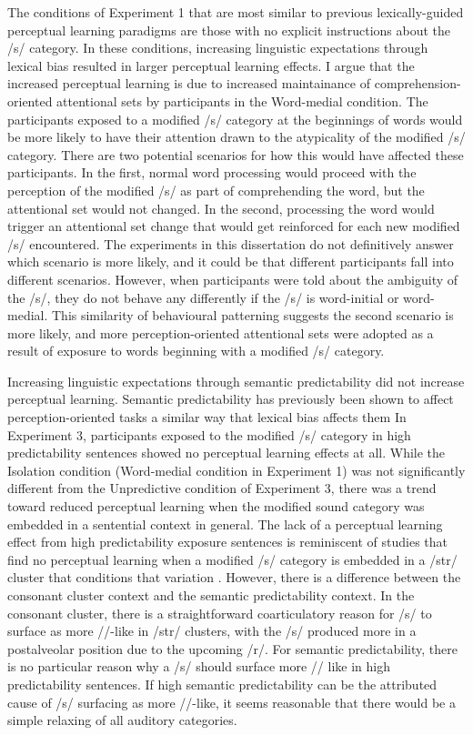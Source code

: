 The conditions of Experiment 1 that are most similar to previous lexically-guided perceptual learning paradigms are those with no explicit instructions about the /s/ category.
In these conditions, increasing linguistic expectations through lexical bias resulted in larger perceptual learning effects.
I argue that the increased perceptual learning is due to increased maintainance of comprehension-oriented attentional sets by participants in the Word-medial condition.
The participants exposed to a modified /s/ category at the beginnings of words would be more likely to have their attention drawn to the atypicality of the modified /s/ category.
There are two potential scenarios for how this would have affected these participants.
In the first, normal word processing would proceed with the perception of the modified /s/ as part of comprehending the word, but the attentional set would not changed.
In the second, processing the word would trigger an attentional set change that would get reinforced for each new modified /s/ encountered.
The experiments in this dissertation do not definitively answer which scenario is more likely, and it could be that different participants fall into different scenarios.
However, when participants were told about the ambiguity of the /s/, they do not behave any differently if the /s/ is word-initial or word-medial.
This similarity of behavioural patterning suggests the second scenario is more likely, and more perception-oriented attentional sets were adopted as a result of exposure to words beginning with a modified /s/ category.

Increasing linguistic expectations through semantic predictability did not increase perceptual learning.
Semantic predictability has previously been shown to affect perception-oriented tasks a similar way that lexical bias affects them\citep{Connine1987,Borsky1998}
In Experiment 3, participants exposed to the modified /s/ category in high predictability sentences showed no perceptual learning effects at all.
While the Isolation condition (Word-medial condition in Experiment 1) was not significantly different from the Unpredictive condition of Experiment 3, there was a trend toward reduced perceptual learning when the modified sound category was embedded in a sentential context in general.
The lack of a perceptual learning effect from high predictability exposure sentences is reminiscent of studies that find no perceptual learning when a modified /s/ category is embedded in a /str/ cluster that conditions that variation \citep{Kraljic2008a}.
However, there is a difference between the consonant cluster context and the semantic predictability context.
In the consonant cluster, there is a straightforward coarticulatory reason for /s/ to surface as more /\textesh/-like in /str/ clusters, with the /s/ produced more in a postalveolar position due to the upcoming /r/.
For semantic predictability, there is no particular reason why a /s/ should surface more /\textesh/ like in high predictability sentences.
If high semantic predictability can be the attributed cause of /s/ surfacing as more /\textesh/-like, it seems reasonable that there would be a simple relaxing of all auditory categories.


